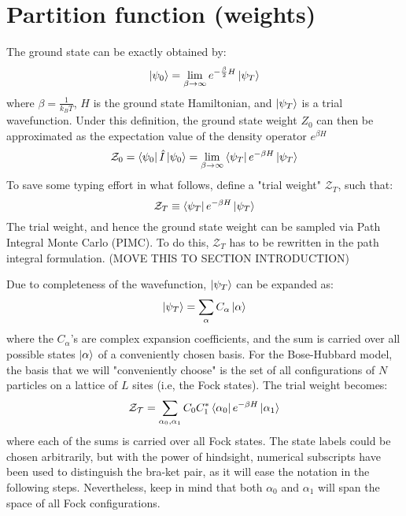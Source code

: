 \documentclass[12pt, two sided]{article}
\begin{document}
\section{Partition function (weights)}

The ground state can be exactly obtained by:
%
\begin{equation}
\ket{\psi_0} = \lim_{\beta\to\infty} e^{-\frac{\beta}{2} H}\ket{\psi_T} 
\end{equation}
%
where $\beta = \frac{1}{k_B  T}$, $H$ is the ground state Hamiltonian, and $\ket{\psi_T}$ is a trial wavefunction. Under this definition, the ground state weight $Z_0$ can then be approximated as the expectation value of the density operator $e^{\beta H}$
%
\begin{equation}
\label{eq:z_0_01}
\mathcal{Z}_0 = \bra{\psi_0} \hat{I} \ket{\psi_0} = \lim_{\beta\to\infty} \bra{\psi_T} e^{-\beta H} \ket{\psi_T}
\end{equation}
%
To save some typing effort in what follows, define a "trial weight" $\mathcal{Z}_T$, such that:
%
\begin{equation}
\mathcal{Z}_T \equiv  \bra{\psi_T} e^{-\beta H} \ket{\psi_T}
\end{equation}
%
The trial weight, and hence the ground state weight can be sampled via Path Integral Monte Carlo (PIMC). To do this, $\mathcal{Z}_T$ has to be rewritten in the path integral formulation. (MOVE THIS TO SECTION INTRODUCTION)

Due to completeness of the wavefunction, $\ket{\psi_T}$ can be expanded as:
%
\begin{equation}
\ket{\psi_T} = \sum_{\alpha} C_{\alpha} \ket{\alpha}
\end{equation}
%
where the $C_\alpha$'s are complex expansion coefficients, and the sum is carried over all possible states $\ket{\alpha}$ of a conveniently chosen basis. For the Bose-Hubbard model, the basis that we will "conveniently choose" is the set of all configurations of $N$ particles on a lattice of $L$ sites (i.e, the Fock states). The trial weight becomes:
%
\begin{equation}
\mathcal{Z_T} = \sum_{\alpha_0, \alpha_1} C_0 C_1^{*} \bra{\alpha_0} e^{-\beta H} \ket{\alpha_1}
\end{equation}
%
where each of the sums is carried over all Fock states. The state labels could be chosen arbitrarily, but with the power of hindsight, numerical subscripts have been used to distinguish the bra-ket pair, as it will ease the notation in the following steps. Nevertheless, keep in mind that both $\alpha_0$ and $\alpha_1$ will span the space of all Fock configurations.
\end{document}

